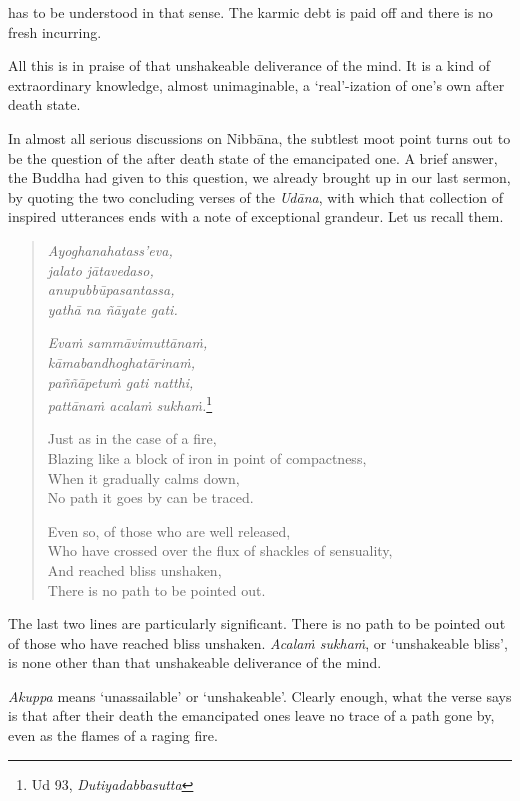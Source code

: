 has to be understood in that sense. The karmic debt is paid off and there is no fresh incurring.

All this is in praise of that unshakeable deliverance of the mind. It is a kind of extraordinary knowledge, almost unimaginable, a `real'-ization of one's own after death state.

In almost all serious discussions on Nibbāna, the subtlest moot point turns out to be the question of the after death state of the emancipated one. A brief answer, the Buddha had given to this question, we already brought up in our last sermon, by quoting the two concluding verses of the \emph{Udāna}, with which that collection of inspired utterances ends with a note of exceptional grandeur. Let us recall them.

\begin{quote}
\emph{Ayoghanahatass'eva,}\\
\emph{jalato jātavedaso,}\\
\emph{anupubbūpasantassa,}\\
\emph{yathā na ñāyate gati.}

\emph{Evaṁ sammāvimuttānaṁ,}\\
\emph{kāmabandhoghatārinaṁ,}\\
\emph{paññāpetuṁ gati natthi,}\\
\emph{pattānaṁ acalaṁ sukhaṁ.}\footnote{Ud 93, \emph{Dutiyadabbasutta}}

\clearpage

Just as in the case of a fire,\\
Blazing like a block of iron in point of compactness,\\
When it gradually calms down,\\
No path it goes by can be traced.

Even so, of those who are well released,\\
Who have crossed over the flux of shackles of sensuality,\\
And reached bliss unshaken,\\
There is no path to be pointed out.
\end{quote}

The last two lines are particularly significant. There is no path to be pointed out of those who have reached bliss unshaken. \emph{Acalaṁ sukhaṁ}, or `unshakeable bliss', is none other than that unshakeable deliverance of the mind.

\emph{Akuppa} means `unassailable' or `unshakeable'. Clearly enough, what the verse says is that after their death the emancipated ones leave no trace of a path gone by, even as the flames of a raging fire.

